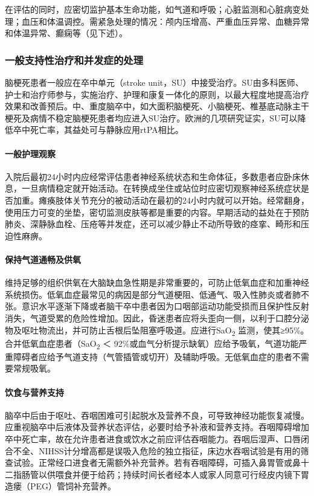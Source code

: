 在评估的同时，应密切监护基本生命功能，如气道和呼吸；心脏监测和心脏病变处理；血压和体温调控。需紧急处理的情况：颅内压增高、严重血压异常、血糖异常和体温异常、癫痫等（见下述）。

\subsubsection{一般支持性治疗和并发症的处理}

脑梗死患者一般应在卒中单元（stroke
unit，SU）中接受治疗。SU由多科医师、护士和治疗师参与，实施治疗、护理和康复一体化的原则，以最大程度地提高治疗效果和改善预后。中、重度脑卒中，如大面积脑梗死、小脑梗死、椎基底动脉主干梗死及病情不稳定脑梗死患者均应进入SU治疗。欧洲的几项研究证实，SU可以降低卒中死亡率，其益处可与静脉应用rtPA相比。

\paragraph{一般护理观察}

入院后最初24小时内应经常评估患者神经系统状态和生命体征，多数患者应卧床休息，一旦病情稳定就开始活动。在转换成坐住或站位时应密切观察神经系统症状是否加重。瘫痪肢体关节充分的被动活动在最初的24小时内就可以开始。经常翻身，使用压力可变的坐垫，密切监测皮肤等都是重要的内容。早期活动的益处在于预防肺炎、深静脉血栓、压疮等并发症，还可以减少静止不动所导致的痉挛、畸形和压迫性麻痹。

\paragraph{保持气道通畅及供氧}

维持足够的组织供氧在大脑缺血急性期是非常重要的，可防止低氧血症和加重神经系统损伤。低氧血症最常见的病因是部分气道梗阻、低通气、吸入性肺炎或者肺不张。意识水平逐渐下降或者脑干卒中患者因为口咽部运动功能受损而且保护性反射消失，气道受累的危险性增加。因此，昏迷患者应将头歪向一侧，以利于口腔分泌物及呕吐物流出，并可防止舌根后坠阻塞呼吸道。应进行SaO\textsubscript{2}
监测，使其≥95\%。合并低氧血症患者（SaO\textsubscript{2} ＜
92\%或血气分析提示缺氧）应给予吸氧，气道功能严重障碍者应给予气道支持（气管插管或切开）及辅助呼吸。无低氧血症的患者不需要常规吸氧。

\paragraph{饮食与营养支持}

脑卒中后由于呕吐、吞咽困难可引起脱水及营养不良，可导致神经功能恢复减慢。应重视脑卒中后液体及营养状态评估，必要时给予补液和营养支持。吞咽障碍增加卒中死亡率，故在允许患者进食或饮水之前应评估吞咽能力。吞咽后湿声、口唇闭合不全、NIHSS计分增高都是误吸入危险的独立指征，床边水吞咽试验是有用的筛查试验。正常经口进食者无需额外补充营养。若有吞咽障碍，可插入鼻胃管或鼻十二指肠管以供喂食并便于给药；持续时间长者经本人或家人同意可行经皮内镜下胃造瘘（PEG）管饲补充营养。

